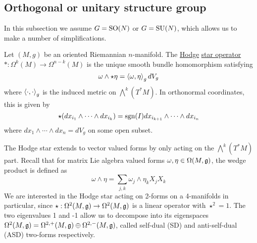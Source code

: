 \subsection{Orthogonal or unitary structure group}
In this subsection we assume $G=\operatorname{SO}(N)$ or  $G=\operatorname{SU}(N)$, which allows us to
make a number of simplifications.
\begin{defn}
	Let $(M,g)$ be an oriented Riemannian  $n$-manifold. The \underline{Hodge}
	\underline{star operator} $* : \Omega^k(M) \to \Omega^{n-k}(M)$ is the 
	unique smooth bundle homomorphism satisfying 
	\begin{equation} \label{eq:hodge_property}
	\omega \wedge \star\eta = \gen{\omega,\eta}_g dV_g
	\end{equation}
	where $\gen{\cdot,\cdot}_g$ is the induced metric on $\bigwedge^k(T^*M)$.
	In orthonormal coordinates, this is given by
	\[
	\star(dx_{i_1}\wedge \cdots\wedge dx_{i_k}) = \operatorname{sgn}(I)dx_{i_{k+1}}\wedge \cdots \wedge
	dx_{i_n} 
	\] 
	where $dx_1\wedge\cdots\wedge dx_n = dV_g$ on some open subset.
\end{defn}
The Hodge star extends to vector valued forms by only acting on the
$\bigwedge^k(T^*M)$ part. Recall that 
for matrix Lie algebra valued forms $\omega,\eta\in\Omega(M,\operatorname{\mathfrak{g}})$, the wedge 
product is defined as 
\begin{equation} \label{eq:matrix_form_wedge}
    \omega\wedge\eta = \sum_{j,k} \omega_j\wedge \eta_k X_j X_k 
\end{equation}
We are interested in the Hodge star acting on 2-forms on a 4-manifolds in
particular, since $\star : \Omega^2(M,\operatorname{\mathfrak{g}})\to\Omega^2(M,\operatorname{\mathfrak{g}})$ is a linear operator
with $\star^2= 1$. The two eigenvalues 1 and -1 allow us to decompose into its
eigenspaces $\Omega^2(M,\operatorname{\mathfrak{g}}) = \Omega^{2,+}(M,\operatorname{\mathfrak{g}}) \oplus \Omega^{2,-}(M,\operatorname{\mathfrak{g}})$,
called self-dual (SD) and anti-self-dual (ASD) two-forms respectively.

